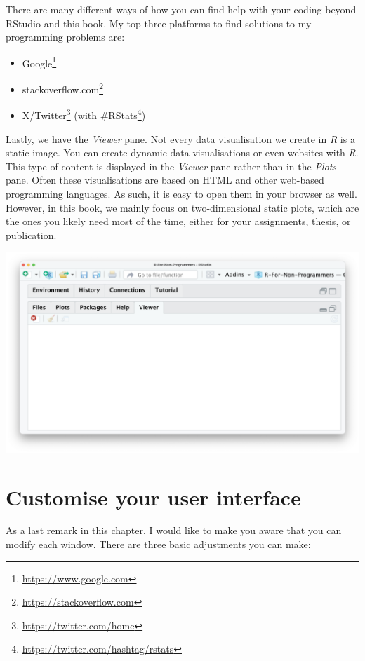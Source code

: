 \documentclass[
  letterpaper,
]{krantz}
\renewcommand{\href}[2]{#2\footnote{\url{#1}}}
\begin{document}
There are many different ways of how you can find help with your coding
beyond RStudio and this book. My top three platforms to find solutions
to my programming problems are:

\begin{itemize}
\item
  \href{https://www.google.com}{Google}
\item
  \href{https://stackoverflow.com}{stackoverflow.com}
\item
  \href{https://twitter.com/home}{X/Twitter} (with
  \href{https://twitter.com/hashtag/rstats}{\#RStats})
\end{itemize}

Lastly, we have the \emph{Viewer} pane. Not every data visualisation we
create in \emph{R} is a static image. You can create dynamic data
visualisations or even websites with \emph{R}. This type of content is
displayed in the \emph{Viewer} pane rather than in the \emph{Plots}
pane. Often these visualisations are based on HTML and other web-based
programming languages. As such, it is easy to open them in your browser
as well. However, in this book, we mainly focus on two-dimensional
static plots, which are the ones you likely need most of the time,
either for your assignments, thesis, or publication.

\includegraphics{images/chapter_04_img/05_files_plots_etc/05_rstudio_viewer.png}

\section{Customise your user
interface}\label{sec-customise-your-user-interface}

As a last remark in this chapter, I would like to make you aware that
you can modify each window. There are three basic adjustments you can
make:
\end{document}
